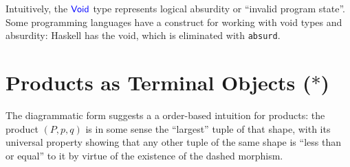 Intuitively, the $\mathsf{{\color{blue}Void}}$ type represents logical absurdity or 
``invalid program state''.
Some programming languages have a construct for working with 
void types and absurdity: Haskell has the void, which is 
eliminated with \texttt{absurd}.



\section{Products as Terminal Objects ($*$)}
\label{sec:products-as-terminal-objects}

The diagrammatic form suggests a
a order-based intuition for products:
the product \((P,p,q)\) is
in some sense the ``largest''
tuple of that shape,
with its universal property
showing that any other tuple of the same shape is
``less than or equal'' to it by virtue of the existence of
the dashed morphism.

